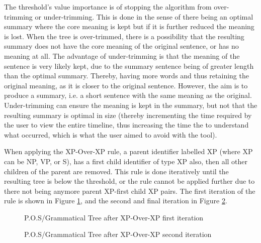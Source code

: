 \par The threshold's value importance is of stopping the algorithm from over-trimming or under-trimming. This is done in the sense of there being an optimal summary where the core meaning is kept but if it is further reduced the meaning is lost. When the tree is over-trimmed, there is a possibility that the resulting summary does not have the core meaning of the original sentence, or has no meaning at all. The advantage of under-trimming is that the meaning of the sentence is very likely kept, due to the summary sentence being of greater length than the optimal summary. Thereby, having more words and thus retaining the original meaning, as it is closer to the original sentence. However, the aim is to produce a summary, i.e. a short sentence with the same meaning as the original. Under-trimming can ensure the meaning is kept in the summary, but not that the resulting summary is optimal in size (thereby incrementing the time required by the user to view the entire timeline, thus increasing the time the to understand what occurred, which is what the user aimed to avoid with the tool).
\par When applying the XP-Over-XP rule, a parent identifier labelled XP (where XP can be NP, VP, or S), has a first child identifier of type XP also, then all other children of the parent are removed. This rule is done iteratively until the resulting tree is below the threshold, or the rule cannot be applied further due to there not being anymore parent XP-first child XP pairs. The first iteration of the rule is shown in Figure \ref{tree:xpOverXpFirst}, and the second and final iteration in Figure \ref{tree:xpOverXpSecond}.
\begin{figure}[h]
\caption{P.O.S/Grammatical Tree after XP-Over-XP first iteration}
\label{tree:xpOverXpFirst}
\end{figure}
\begin{figure}[h]
\caption{P.O.S/Grammatical Tree after XP-Over-XP second iteration}
\label{tree:xpOverXpSecond}
\end{figure}
